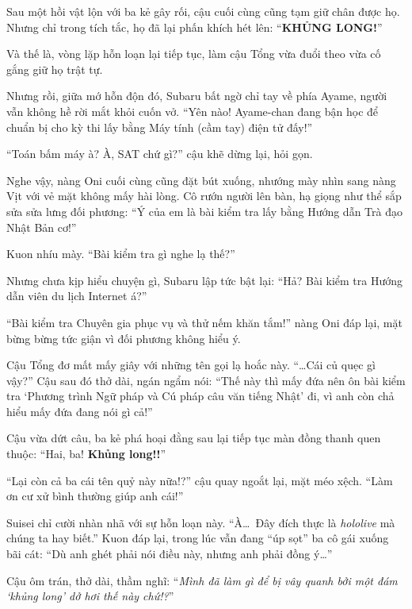 \documentclass[../main.tex]{subfiles}
\begin{document}
Sau một hồi vật lộn với ba kẻ gây rối, cậu cuối cùng cũng tạm giữ chân được họ. Nhưng chỉ trong tích tắc, họ đã lại phấn khích hét lên: ``\textbf{KHỦNG LONG!}''

Và thế là, vòng lặp hỗn loạn lại tiếp tục, làm cậu Tổng vừa đuổi theo vừa cố gắng giữ họ trật tự.

Nhưng rồi, giữa mớ hỗn độn đó, Subaru bất ngờ chỉ tay về phía Ayame, người vẫn không hề rời mắt khỏi cuốn vở. ``Yên nào! Ayame-chan đang bận học để chuẩn bị cho kỳ thi lấy bằng Máy tính (cầm tay) điện tử đấy!''


``Toán bấm máy à? À, SAT chứ gì?'' cậu khẽ dừng lại, hỏi gọn.

Nghe vậy, nàng Oni cuối cùng cũng đặt bút xuống, nhướng mày nhìn sang nàng Vịt với vẻ mặt không mấy hài lòng. Cô rướn người lên bàn, hạ giọng như thể sắp sửa sửa lưng đối phương: ``Ý của em là bài kiểm tra lấy bằng Hướng dẫn Trà đạo Nhật Bản cơ!''

Kuon nhíu mày. ``Bài kiểm tra gì nghe lạ thế?''

Nhưng chưa kịp hiểu chuyện gì, Subaru lập tức bật lại: ``Hả? Bài kiểm tra Hướng dẫn viên du lịch Internet á?''

``Bài kiểm tra Chuyên gia phục vụ và thử nếm khăn tắm!'' nàng Oni đáp lại, mặt bừng bừng tức giận vì đối phương không hiểu ý.

Cậu Tổng đơ mất mấy giây với những tên gọi lạ hoắc này. ``\dots Cái củ quẹc gì vậy?'' Cậu sau đó thở dài, ngán ngẩm nói: ``Thế này thì mấy đứa nên ôn bài kiểm tra `Phương trình Ngữ pháp và Cú pháp câu văn tiếng Nhật' đi, vì anh còn chả hiểu mấy đứa đang nói gì cả!''

Cậu vừa dứt câu, ba kẻ phá hoại đằng sau lại tiếp tục màn đồng thanh quen thuộc: ``Hai, ba! \textbf{Khủng long!!}''

``Lại còn cả ba cái tên quỷ này nữa!?'' cậu quay ngoắt lại, mặt méo xệch. ``Làm ơn cư xử bình thường giúp anh cái!''


Suisei chỉ cười nhàn nhã với sự hỗn loạn này. ``À\dots\ Đây đích thực là \textit{hololive} mà chúng ta hay biết.'' Kuon đáp lại, trong lúc vẫn đang ``úp sọt'' ba cô gái xuống bãi cát: ``Dù anh ghét phải nói điều này, nhưng anh phải đồng ý\dots''

Cậu ôm trán, thở dài, thầm nghĩ: ``\textit{Mình đã làm gì để bị vây quanh bởi một đám `khủng long' dở hơi thế này chứ!?}''

\subsection*{\label{ep-S13.IX}}
\end{document}
